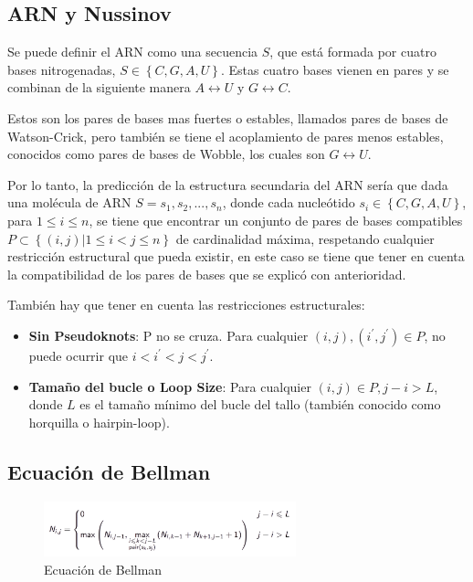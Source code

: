 \documentclass[11pt,letterpaper]{article}
\begin{document}
\subsection{ARN y Nussinov}
Se puede definir el ARN como una secuencia $S$, que está formada por cuatro bases nitrogenadas, $S \in \left\{C, G, A, U\right\}$. Estas cuatro bases vienen en pares y se combinan de la siguiente manera $A \leftrightarrow U$ y $G \leftrightarrow C$.

Estos son los pares de bases mas fuertes o estables, llamados pares de bases de Watson-Crick, pero también se tiene el acoplamiento de pares menos estables, conocidos como pares de bases de Wobble, los cuales son $G \leftrightarrow U$.

Por lo tanto, la predicción de la estructura secundaria del ARN sería que dada una molécula de ARN $S = s_{1}, s_{2}, ..., s_{n}$, donde cada nucleótido $s_{i} \in \left\{C, G, A, U\right\}$, para $1 \leqslant i \leqslant n$, se tiene que encontrar un conjunto de pares de bases compatibles $P \subset \left\{(i, j) | 1 \leqslant i < j \leqslant n\right\}$ de cardinalidad máxima, respetando cualquier restricción estructural que pueda existir, en este caso se tiene que tener en cuenta la compatibilidad de los pares de bases que se explicó con anterioridad.

También hay que tener en cuenta las restricciones estructurales:

\begin{itemize}
	\item \textbf{Sin Pseudoknots}: P no se cruza. Para cualquier $(i, j),(i^{'}, j^{'}) \in  P$, no puede ocurrir que $i< i^{'} < j < j^{'}$.
	\item \textbf{Tamaño del bucle o Loop Size}: Para cualquier $(i, j) \in P, j - i > L $, donde  $L$ es el tamaño mínimo del bucle del tallo (también conocido como horquilla o hairpin-loop).
\end{itemize}

\subsection{Ecuación de Bellman}

\begin{figure}[H]
	\centering
	\includegraphics[width=0.65\textwidth]{bellman.png}
	\caption{Ecuación de Bellman}
	\label{fig:bellman}
\end{figure}
\end{document}

